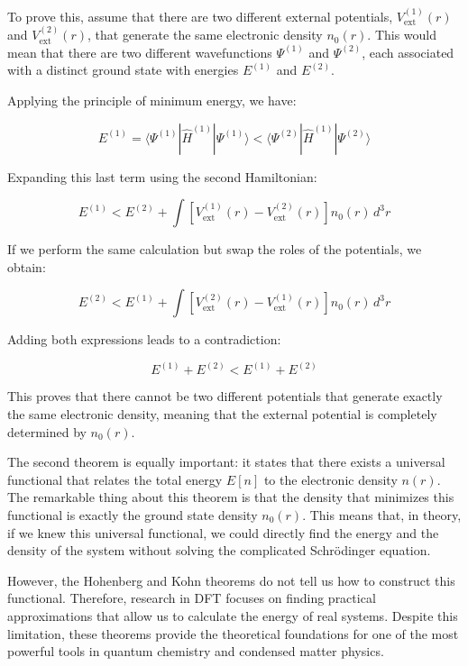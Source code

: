 \documentclass[%
 preprint, linenumbers,
 amsmath,amssymb,
 aps, physrev,
]{revtex4-2}
\begin{document}
To prove this, assume that there are two different external potentials, \( V_{\text{ext}}^{(1)}(r) \) and \( V_{\text{ext}}^{(2)}(r) \), that generate the same electronic density \( n_0(r) \). This would mean that there are two different wavefunctions \( \Psi^{(1)} \) and \( \Psi^{(2)} \), each associated with a distinct ground state with energies \( E^{(1)} \) and \( E^{(2)} \).  

Applying the principle of minimum energy, we have:

\begin{equation}
E^{(1)} = \langle \Psi^{(1)} | \hat{H}^{(1)} | \Psi^{(1)} \rangle < \langle \Psi^{(2)} | \hat{H}^{(1)} | \Psi^{(2)} \rangle
\end{equation}

Expanding this last term using the second Hamiltonian:

\begin{equation}
E^{(1)} < E^{(2)} + \int \left[V_{\text{ext}}^{(1)}(r) - V_{\text{ext}}^{(2)}(r) \right] n_0(r) \, d^3r
\end{equation}

If we perform the same calculation but swap the roles of the potentials, we obtain:

\begin{equation}
E^{(2)} < E^{(1)} + \int \left[V_{\text{ext}}^{(2)}(r) - V_{\text{ext}}^{(1)}(r)\right] n_0(r) \, d^3r
\end{equation}

Adding both expressions leads to a contradiction:

\begin{equation}
E^{(1)} + E^{(2)} < E^{(1)} + E^{(2)}
\end{equation}

This proves that there cannot be two different potentials that generate exactly the same electronic density, meaning that the external potential is completely determined by \( n_0(r) \).

The second theorem is equally important: it states that there exists a universal functional that relates the total energy \( E[n] \) to the electronic density \( n(r) \). The remarkable thing about this theorem is that the density that minimizes this functional is exactly the ground state density \( n_0(r) \). This means that, in theory, if we knew this universal functional, we could directly find the energy and the density of the system without solving the complicated Schrödinger equation.

However, the Hohenberg and Kohn theorems do not tell us how to construct this functional. Therefore, research in DFT focuses on finding practical approximations that allow us to calculate the energy of real systems. Despite this limitation, these theorems provide the theoretical foundations for one of the most powerful tools in quantum chemistry and condensed matter physics. 
\end{document}
